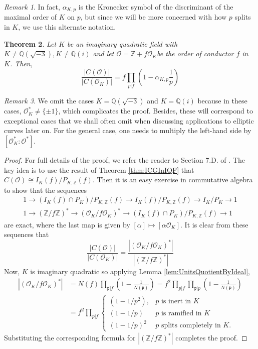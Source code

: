 \documentclass{amsart}
\newtheorem{thm}{Theorem}[section]
\theoremstyle{definition}
\theoremstyle{remark}
\newtheorem{remark}[thm]{Remark}
\numberwithin{equation}{section}
\newcommand{\cO}{\mathcal O}
\newcommand{\fkp}{\mathfrak p}
\newcommand{\bbQ}{\mathbb Q}
\newcommand{\bbZ}{\mathbb Z}
\begin{document}
\begin{remark}
In fact, $\alpha_{K,p}$ is the Kronecker symbol of the discriminant of the maximal order of $K$ on $p$, but since we will be more concerned with how $p$ splits in $K$, we use this alternate notation.
\end{remark}

\begin{thm}\label{thm:RelativeSizesOfClassGroups}
Let $K$ be an imaginary quadratic field with $K \neq \bbQ(\sqrt{-3}), K \neq \bbQ(i)$ and let $\cO = \bbZ + f\cO_{K}$be the order of conductor $f$ in $K$. Then,
\[
\frac{|C(\cO)|}{|C(\cO_{K})|} = f \prod_{p|f}\left(1 - \alpha_{K,p}\frac{1}{p}\right)
\]
\end{thm}

\begin{remark}
We omit the cases $K = \bbQ(\sqrt{-3})$ and $K = \bbQ(i)$ because in these cases, $\cO_{K}^* \neq \{\pm 1\}$, which complicates the proof. Besides, these will correspond to exceptional cases that we shall often omit when discussing applications to elliptic curves later on. For the general case, one needs to multiply the left-hand side by $[\cO_{K}^*:\cO^*]$.
\end{remark}

\begin{proof}
For full details of the proof, we refer the reader to Section 7.D. of \cite{CoxPrimes}. The key idea is to use the result of Theorem \ref{thm:ICGInIQF} that $C(\cO) \cong I_{K}(f)/P_{K,\bbZ}(f)$. Then it is an easy exercise in commutative algebra to show that the sequences
\begin{align*}
1 \to (I_{K}(f) \cap P_{K})/P_{K,\bbZ}(f) \to I_{K}(f)/P_{K,\bbZ}(f) \to I_{K}/P_{K} \to 1 \\
1 \to (\bbZ/f\bbZ)^* \to (\cO_{K}/f\cO_{K})^* \to (I_{K}(f)\cap P_{K})/P_{K,\bbZ}(f) \to 1
\end{align*}
are exact, where the last map is given by $[\alpha] \mapsto [\alpha\cO_{K}]$. It is clear from these sequences that
\[
\frac{|C(\cO)|}{|C(\cO_{K})|} = \frac{|(\cO_{K}/f\cO_{K})^*|}{|(\bbZ/f\bbZ)^*|}
\]
Now, $K$ is imaginary quadratic so applying Lemma \ref{lem:UnitsQuotientByIdeal},
\begin{align*}
 |(\cO_{K}/f\cO_{K})^*| &= N(f) \prod_{\fkp|f}\left(1 - \frac{1}{N(\fkp)}\right) = f^2 \prod_{p|f}\prod_{\fkp|p}\left(1 - \frac{1}{N(\fkp)}\right)\\
 &= f^2 \prod_{p|f}\begin{cases}
 \left(1 - 1/p^2\right), & p \text{ is inert in } K\\
(1 - 1/p) & p \text{ is ramified in } K\\
(1 - 1/p)^2 & p \text{ splits completely in } K.
 \end{cases}
\end{align*}
Substituting the corresponding formula for $|(\bbZ/f\bbZ)^*|$ completes the proof.
\end{proof}
\end{document}
